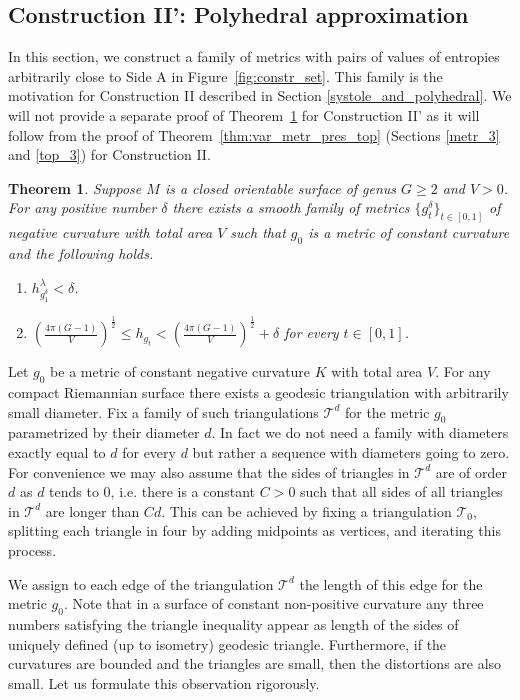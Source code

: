\documentclass[12pt]{article}
\numberwithin{equation}{section}
\newtheorem{thm}{Theorem}
\theoremstyle{definition}
\begin{document}
\subsection{Construction II': Polyhedral approximation}\label{constr2}

In this section, we construct a family of metrics with pairs of values of entropies arbitrarily close to Side A in  Figure~\ref{fig:constr_set}. This family is the motivation for Construction II described in Section \ref{systole_and_polyhedral}. We will not provide a separate proof of Theorem~\ref{thm:decr_metr_entropy} for Construction II' as it will follow from the proof of Theorem~\ref{thm:var_metr_pres_top} (Sections \ref{metr_3} and \ref{top_3}) for Construction II.

\begin{thm}\label{thm:decr_metr_entropy}
Suppose $M$ is a closed  orientable surface of genus $G\geq 2$ and $V>0$. For any positive number $\delta$ there exists a smooth family of metrics $\{g_t^\delta\}_{t\in[0,1]}$ of negative curvature with total area $V$ such that $g_0$ is a metric of constant curvature and the following holds.
\begin{enumerate}
\item $h^\lambda_{g^\delta_1}<\delta$.\label{C-inequality}

\item $\left(\frac{4\pi(G-1)}{V}\right)^{\frac{1}{2}}\leqslant h_{g_t}<\left(\frac{4\pi(G-1)}{V}\right)^{\frac{1}{2}}+\delta$ for every $t\in [0,1]$. 
\end{enumerate}
\end{thm}

Let $g_0$ be a metric of constant negative curvature $K$ with total area $V$. For any compact Riemannian surface there exists a geodesic triangulation with arbitrarily small diameter. Fix a family of such triangulations $\mathcal T^d$ for the metric $g_0$ parametrized by their diameter $d$. 
In fact we do not need a family with diameters exactly equal to $d$ for every $d$ but rather a sequence with diameters going to zero. For convenience  we may also assume that the sides of triangles in $\mathcal T^d$ are of order $d$ as $d$ tends to $0$, i.e. there is a constant $C>0$ such that all sides of all triangles in $\mathcal T^d$ are longer than $Cd$. This can be achieved by fixing a triangulation $\mathcal T_0$, splitting each triangle in four by adding midpoints as vertices, and iterating this process. 


We assign to each edge of the triangulation $\mathcal T^d$ the length of this edge for the metric $g_0$. Note that in a surface of constant non-positive curvature any three numbers satisfying  the triangle inequality appear as length of the sides of uniquely defined  (up to isometry) geodesic triangle. Furthermore, if the curvatures are bounded and the triangles are small, then the distortions are also small. Let us formulate this observation rigorously. 
\end{document}
